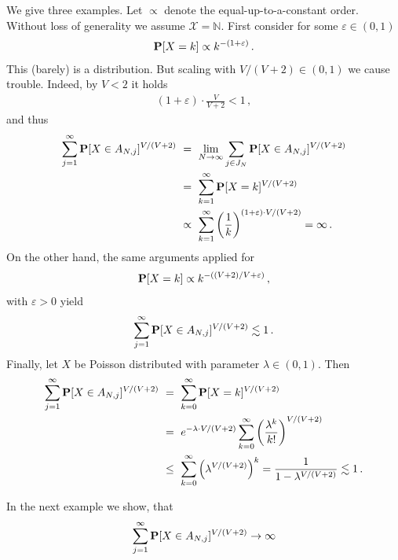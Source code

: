 \begin{example}
  We give three examples. Let $\propto$ denote the equal-up-to-a-constant order.
  Without loss of generality we assume $\mathcal{X}=\mathbb{N}$.
  First consider
  for some $\varepsilon\in(0,1)$
  \begin{gather*}
    \P[X=k]
    \propto
    k^{-(1+\varepsilon)}
    \,.
  \end{gather*}
  This (barely) is a distribution. But scaling with $V/(V+2)\in(0,1)$ we cause trouble. Indeed, by $V<2$ it holds
  \begin{gather*}
    (
    1+\varepsilon
    )
    \cdot
    \frac{V}{V+2}
    <1
    \,,
  \end{gather*}
  and thus
  \begin{align*}
  \sum_{j=1}^\infty
  \P
  [
  X\in A_{N,j}
  ]^{V/(V+2)}
  &
  \ 
  =
  \ 
  \lim_{N\to\infty}
  \sum_{j\in J_N}
  \P
  [
  X\in A_{N,j}
  ]^{V/(V+2)}
  \\
  &
  \ 
  =
  \ 
  \sum_{k=1}^{\infty} 
  \P
  [
  X=k
  ]^{V/(V+2)}
  \\
  &
  \ 
  \propto
  \ 
  \sum_{k=1}^{\infty} 
  \left( 
  \frac{1}{k}
  \right)
  ^{(1+\varepsilon)\cdot V/(V+2)}
  =\infty
  \,.
  \end{align*}
  On the other hand, the same arguments applied for
  \begin{gather*}
    \P[X=k]
    \propto
    k^{-((V+2)/V+\varepsilon)}
    \,,
  \end{gather*}
  with $\varepsilon>0$ yield
\begin{gather*}
  \sum_{j=1}^\infty
  \P
  [
  X\in A_{N,j}
  ]^{V/(V+2)}
  \lesssim 1
  \,.
\end{gather*}
Finally, let $X$ be Poisson distributed with parameter $\lambda\in(0,1)$.
Then
\begin{align*}
  \sum_{j=1}^\infty
  \P
  [
  X\in A_{N,j}
  ]^{V/(V+2)}
  &
  \ 
  =
  \ 
  \sum_{k=0}^{\infty} 
  \P
  [
  X=k
  ]^{V/(V+2)}
  \\
  &
  \ 
  =
  \ 
  e^{-\lambda\cdot V/(V+2)}
  \sum_{k=0}^{\infty} 
  \left( 
    \frac{\lambda^k}{k\text{!}}
  \right)
  ^{V/(V+2)}
  \\
  &
  \ 
  \le
  \ 
  \sum_{k=0}^{\infty} 
\left( 
    \lambda
  ^{V/(V+2)}
\right)^k
  =
  \frac{1}
  {
    1-
    \lambda
  ^{V/(V+2)}
  }
  \lesssim 1
  \,.
  \end{align*}

\end{example}
In the next example we show, that 
\begin{gather*}
  \sum_{j=1}^\infty
  \P
  [
  X\in A_{N,j}
  ]^{V/(V+2)}
  \to
  \infty
\end{gather*}
